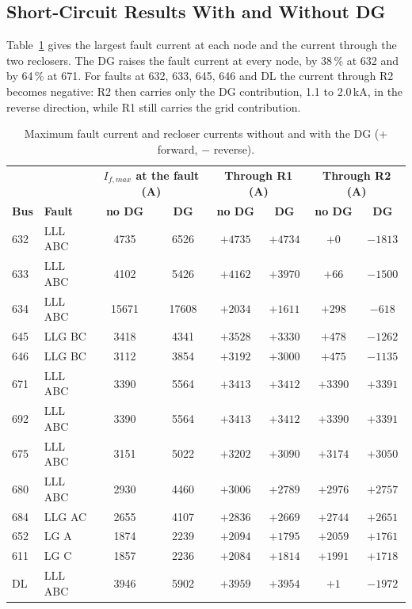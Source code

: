 \documentclass[12pt,letterpaper]{article}
\newcommand{\hd}{\rowcolor{headc}}
\begin{document}
\subsection{Short-Circuit Results With and Without DG}
Table~\ref{tab:fault} gives the largest fault current at each node and the current through the two reclosers.
The DG raises the fault current at every node, by 38\,\% at 632 and by 64\,\% at 671. For faults at 632,
633, 645, 646 and DL the current through R2 becomes negative: R2 then carries only the DG contribution, 1.1
to 2.0\,kA, in the reverse direction, while R1 still carries the grid contribution.

\begin{table}[H]
\centering\footnotesize
\begin{tabular}{@{}llcccccc@{}}
\toprule
\hd & & \multicolumn{2}{c}{\textbf{$I_{f,max}$ at the fault (A)}} & \multicolumn{2}{c}{\textbf{Through R1 (A)}} & \multicolumn{2}{c}{\textbf{Through R2 (A)}} \\
\hd\textbf{Bus} & \textbf{Fault} & \textbf{no DG} & \textbf{DG} & \textbf{no DG} & \textbf{DG} & \textbf{no DG} & \textbf{DG} \\
\midrule
632 & LLL ABC & 4735 & 6526 & $+4735$ & $+4734$ & $+0$ & $-1813$ \\
633 & LLL ABC & 4102 & 5426 & $+4162$ & $+3970$ & $+66$ & $-1500$ \\
634 & LLL ABC & 15671 & 17608 & $+2034$ & $+1611$ & $+298$ & $-618$ \\
645 & LLG BC & 3418 & 4341 & $+3528$ & $+3330$ & $+478$ & $-1262$ \\
646 & LLG BC & 3112 & 3854 & $+3192$ & $+3000$ & $+475$ & $-1135$ \\
671 & LLL ABC & 3390 & 5564 & $+3413$ & $+3412$ & $+3390$ & $+3391$ \\
692 & LLL ABC & 3390 & 5564 & $+3413$ & $+3412$ & $+3390$ & $+3391$ \\
675 & LLL ABC & 3151 & 5022 & $+3202$ & $+3090$ & $+3174$ & $+3050$ \\
680 & LLL ABC & 2930 & 4460 & $+3006$ & $+2789$ & $+2976$ & $+2757$ \\
684 & LLG AC & 2655 & 4107 & $+2836$ & $+2669$ & $+2744$ & $+2651$ \\
652 & LG A & 1874 & 2239 & $+2094$ & $+1795$ & $+2059$ & $+1761$ \\
611 & LG C & 1857 & 2236 & $+2084$ & $+1814$ & $+1991$ & $+1718$ \\
DL & LLL ABC & 3946 & 5902 & $+3959$ & $+3954$ & $+1$ & $-1972$ \\
\bottomrule
\end{tabular}
\caption{Maximum fault current and recloser currents without and with the DG (+ forward, $-$ reverse).}
\label{tab:fault}
\end{table}
\end{document}
